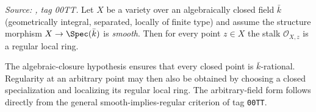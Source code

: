 \begin{lemma}\leanok
  \label{lem:smooth_to_regular_local_ring}
  \textit{Source: \cite{stacks-project}, tag 00TT.}
  Let \(X\) be a variety over an algebraically closed field \(\bar k\) (geometrically
  integral, separated, locally of finite type) and assume the structure morphism
  \(X \to \Spec(\bar k)\) is \emph{smooth}. Then for every point \(z \in X\) the
  stalk \(\mathcal O_{X, z}\) is a regular local ring.

  The algebraic-closure hypothesis ensures that every closed point is
  \(\bar k\)-rational. Regularity at an arbitrary point may then also be obtained by
  choosing a closed specialization and localizing its regular local ring. The
  arbitrary-field form follows directly from the general smooth-implies-regular
  criterion of tag \texttt{00TT}.
\end{lemma}


